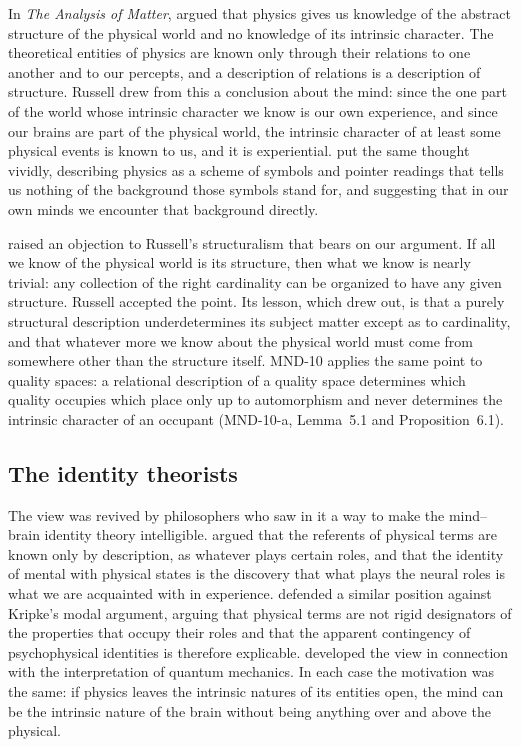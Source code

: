 \documentclass{situationist-preprint}
\begin{document}
In \emph{The Analysis of Matter}, \citet{Russell1927} argued that physics gives us knowledge of the abstract structure of the physical world and no knowledge of its intrinsic character. The theoretical entities of physics are known only through their relations to one another and to our percepts, and a description of relations is a description of structure. Russell drew from this a conclusion about the mind: since the one part of the world whose intrinsic character we know is our own experience, and since our brains are part of the physical world, the intrinsic character of at least some physical events is known to us, and it is experiential. \citet{Eddington1928} put the same thought vividly, describing physics as a scheme of symbols and pointer readings that tells us nothing of the background those symbols stand for, and suggesting that in our own minds we encounter that background directly.

\citet{Newman1928} raised an objection to Russell's structuralism that bears on our argument. If all we know of the physical world is its structure, then what we know is nearly trivial: any collection of the right cardinality can be organized to have any given structure. Russell accepted the point. Its lesson, which \citet{DemopoulosFriedman1985} drew out, is that a purely structural description underdetermines its subject matter except as to cardinality, and that whatever more we know about the physical world must come from somewhere other than the structure itself. MND-10 applies the same point to quality spaces: a relational description of a quality space determines which quality occupies which place only up to automorphism and never determines the intrinsic character of an occupant (MND-10-a, Lemma~5.1 and Proposition~6.1).

\subsection{The identity theorists}

The view was revived by philosophers who saw in it a way to make the mind--brain identity theory intelligible. \citet{Feigl1958} argued that the referents of physical terms are known only by description, as whatever plays certain roles, and that the identity of mental with physical states is the discovery that what plays the neural roles is what we are acquainted with in experience. \citet{Maxwell1978} defended a similar position against Kripke's modal argument, arguing that physical terms are not rigid designators of the properties that occupy their roles and that the apparent contingency of psychophysical identities is therefore explicable. \citet{Lockwood1989} developed the view in connection with the interpretation of quantum mechanics. In each case the motivation was the same: if physics leaves the intrinsic natures of its entities open, the mind can be the intrinsic nature of the brain without being anything over and above the physical.
\end{document}
